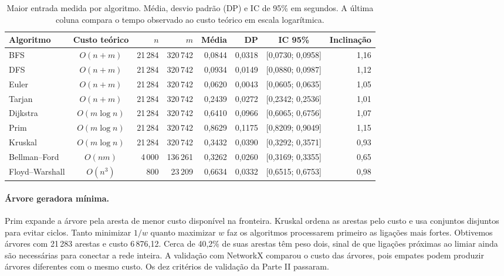 \documentclass[sigconf,nonacm]{webmedia}
\begin{document}
\begin{table}[tbp]
\centering
\caption{Maior entrada medida por algoritmo. Média, desvio padrão (DP) e IC de 95\% em segundos. A última coluna compara o tempo observado ao custo teórico em escala logarítmica.}
\label{tab:tempos}
\small
\begin{tabular}{@{}lcrrrrcr@{}}
\toprule
Algoritmo & Custo teórico & \(n\) & \(m\) & Média & DP & IC 95\% & Inclinação \\
\midrule
BFS & \(O(n+m)\) & 21\,284 & 320\,742 & 0,0844 & 0,0318 & [0,0730; 0,0958] & 1,16 \\
DFS & \(O(n+m)\) & 21\,284 & 320\,742 & 0,0934 & 0,0149 & [0,0880; 0,0987] & 1,12 \\
Euler & \(O(n+m)\) & 21\,284 & 320\,742 & 0,0620 & 0,0043 & [0,0605; 0,0635] & 1,05 \\
Tarjan & \(O(n+m)\) & 21\,284 & 320\,742 & 0,2439 & 0,0272 & [0,2342; 0,2536] & 1,01 \\
Dijkstra & \(O(m\log n)\) & 21\,284 & 320\,742 & 0,6410 & 0,0966 & [0,6065; 0,6756] & 1,07 \\
Prim & \(O(m\log n)\) & 21\,284 & 320\,742 & 0,8629 & 0,1175 & [0,8209; 0,9049] & 1,15 \\
Kruskal & \(O(m\log n)\) & 21\,284 & 320\,742 & 0,3432 & 0,0390 & [0,3292; 0,3571] & 0,93 \\
Bellman--Ford & \(O(nm)\) & 4\,000 & 136\,261 & 0,3262 & 0,0260 & [0,3169; 0,3355] & 0,65 \\
Floyd--Warshall & \(O(n^3)\) & 800 & 23\,209 & 0,6634 & 0,0332 & [0,6515; 0,6753] & 0,98 \\
\bottomrule
\end{tabular}
\end{table}

\paragraph{Árvore geradora mínima.}
Prim expande a árvore pela aresta de menor custo disponível na
fronteira. Kruskal ordena as arestas pelo custo e usa conjuntos
disjuntos para evitar ciclos. Tanto minimizar \(1/w\) quanto
maximizar \(w\) faz os algoritmos processarem primeiro as ligações
mais fortes. Obtivemos árvores com 21\,283 arestas e custo
6\,876,12. Cerca de 40,2\% de suas arestas têm peso dois, sinal
de que ligações próximas ao limiar ainda são necessárias para
conectar a rede inteira. A validação com NetworkX comparou o custo
das árvores, pois empates podem produzir árvores diferentes com
o mesmo custo. Os dez critérios de validação da Parte II passaram.
\end{document}
